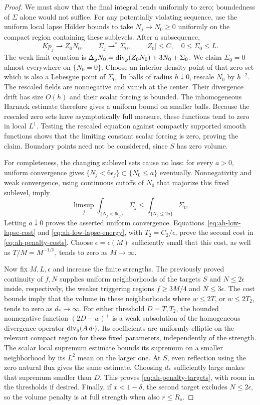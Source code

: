 \begin{proof}
We must show that the final integral tends uniformly to zero;
boundedness of \(\Sigma\) alone would not suffice.
For any potentially violating sequence, use the uniform
local lapse Hölder bounds to take \(N_j\to N_0\ge0\)
uniformly on the compact region containing these sublevels.
After a subsequence,
\[
 Kp_j\rightharpoonup Z_0N_0,\qquad
 \Sigma_j\rightharpoonup^*\Sigma_0,\qquad
 |Z_0|\le C,\quad 0\le\Sigma_0\le L .
\]
The weak limit equation is
\(\Delta_gN_0=\operatorname{div}_g(Z_0N_0)+3N_0+\Sigma_0\).
We claim \(\Sigma_0=0\) almost everywhere on \(\{N_0=0\}\).
Choose an interior density point of that zero set which is
also a Lebesgue point of \(\Sigma_0\).  In balls of radius
\(h\downarrow0\), rescale \(N_0\) by \(h^{-2}\).
The rescaled fields are nonnegative and vanish at the center.
Their divergence drift has size \(O(h)\) and their scalar
forcing is bounded.  The inhomogeneous Harnack estimate
therefore gives a uniform bound on smaller balls.
Because the rescaled zero sets have asymptotically full
measure, these functions tend to zero in local \(L^1\).
Testing the rescaled equation against compactly supported
smooth functions shows that the limiting constant scalar
forcing is zero, proving the claim.  Boundary points need
not be considered, since \(S\) has zero volume.

For completeness, the changing sublevel sets cause no loss:
for every \(a>0\), uniform convergence gives
\(\{N_j<6\epsilon_j\}\subset\{N_0\le a\}\) eventually.
Nonnegativity and weak convergence, using continuous cutoffs
of \(N_0\) that majorize this fixed sublevel, imply
\[
 \limsup_j\int_{\{N_j<6\epsilon_j\}}\Sigma_j
 \le \int_{\{N_0\le2a\}}\Sigma_0.
\]
Letting \(a\downarrow0\) proves the asserted uniform convergence.
Equations~\eqref{eq:ah-low-lapse-cost} and
\eqref{eq:ah-low-lapse-energy}, with \(T_2=C_2/\epsilon\),
prove the second cost in \eqref{eq:ah-penalty-costs}.
Choose \(\epsilon=\epsilon(M)\) sufficiently small that this
cost, as well as \(T/M=M^{-1/5}\), tends to zero as \(M\to\infty\).

Now fix \(M,L,\epsilon\) and increase the finite strengths.
The previously proved continuity of \(f,N\) supplies uniform
neighborhoods of the targets \(S\) and \(N\le2\epsilon\)
inside, respectively, the weaker triggering regions
\(f\ge3M/4\) and \(N\le3\epsilon\).
The cost bounds imply that the volume in these neighborhoods
where \(w\le2T\), or \(w\le2T_2\), tends to zero as
\(d_*\to\infty\).
For either threshold \(D=T,T_2\), the bounded nonnegative
function \((2D-w)^+\) is a weak subsolution of the homogeneous
divergence operator \(\operatorname{div}_g(A\,d\cdot)\).
Its coefficients are uniformly elliptic on the relevant
compact region for these fixed parameters, independently of
the strength.  The scalar local supremum estimate bounds its
supremum on a smaller neighborhood by its \(L^2\) mean on the
larger one.  At \(S\), even reflection using the zero natural
flux gives the same estimate.  Choosing \(d_*\) sufficiently
large makes that supremum smaller than \(D\).
This proves \eqref{eq:ah-penalty-targets}, with room in the
thresholds if desired.  Finally, if \(x<1-\delta\), the
second target excludes \(N\le2\epsilon\), so the volume
penalty is at full strength when also \(r\le R_s\).
\end{proof}

